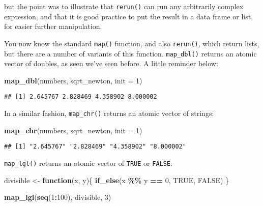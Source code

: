 \documentclass[
]{article}
\newenvironment{Shaded}{\begin{snugshade}}{\end{snugshade}}
\newcommand{\ControlFlowTok}[1]{\textcolor[rgb]{0.13,0.29,0.53}{\textbf{#1}}}
\newcommand{\DataTypeTok}[1]{\textcolor[rgb]{0.13,0.29,0.53}{#1}}
\newcommand{\DecValTok}[1]{\textcolor[rgb]{0.00,0.00,0.81}{#1}}
\newcommand{\KeywordTok}[1]{\textcolor[rgb]{0.13,0.29,0.53}{\textbf{#1}}}
\newcommand{\NormalTok}[1]{#1}
\newcommand{\OperatorTok}[1]{\textcolor[rgb]{0.81,0.36,0.00}{\textbf{#1}}}
\newcommand{\OtherTok}[1]{\textcolor[rgb]{0.56,0.35,0.01}{#1}}
\newcommand{\StringTok}[1]{\textcolor[rgb]{0.31,0.60,0.02}{#1}}
\begin{document}
but the point was to illustrate that \texttt{rerun()} can run any arbitrarily complex expression, and that it is good
practice to put the result in a data frame or list, for easier further manipulation.

You now know the standard \texttt{map()} function, and also \texttt{rerun()}, which return lists, but there are a
number of variants of this function. \texttt{map\_dbl()} returns an atomic vector of doubles, as seen
we've seen before. A little reminder below:

\begin{Shaded}
\begin{Highlighting}[]
\KeywordTok{map\_dbl}\NormalTok{(numbers, sqrt\_newton, }\DataTypeTok{init =} \DecValTok{1}\NormalTok{)}
\end{Highlighting}
\end{Shaded}

\begin{verbatim}
## [1] 2.645767 2.828469 4.358902 8.000002
\end{verbatim}

In a similar fashion, \texttt{map\_chr()} returns an atomic vector of strings:

\begin{Shaded}
\begin{Highlighting}[]
\KeywordTok{map\_chr}\NormalTok{(numbers, sqrt\_newton, }\DataTypeTok{init =} \DecValTok{1}\NormalTok{)}
\end{Highlighting}
\end{Shaded}

\begin{verbatim}
## [1] "2.645767" "2.828469" "4.358902" "8.000002"
\end{verbatim}

\texttt{map\_lgl()} returns an atomic vector of \texttt{TRUE} or \texttt{FALSE}:

\begin{Shaded}
\begin{Highlighting}[]
\NormalTok{divisible \textless{}{-}}\StringTok{ }\ControlFlowTok{function}\NormalTok{(x, y)\{}
  \KeywordTok{if\_else}\NormalTok{(x }\OperatorTok{\%\%}\StringTok{ }\NormalTok{y }\OperatorTok{==}\StringTok{ }\DecValTok{0}\NormalTok{, }\OtherTok{TRUE}\NormalTok{, }\OtherTok{FALSE}\NormalTok{)}
\NormalTok{\}}

\KeywordTok{map\_lgl}\NormalTok{(}\KeywordTok{seq}\NormalTok{(}\DecValTok{1}\OperatorTok{:}\DecValTok{100}\NormalTok{), divisible, }\DecValTok{3}\NormalTok{)}
\end{Highlighting}
\end{Shaded}
\end{document}
